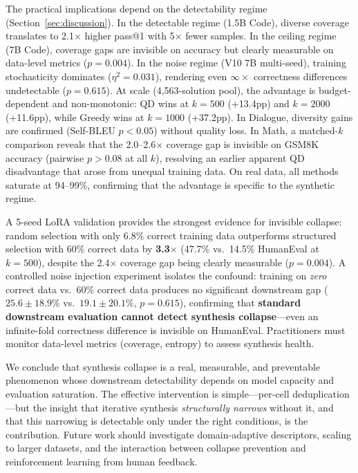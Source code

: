 \documentclass{article}
\begin{document}
\begin{enumerate}[nosep]
The practical implications depend on the detectability regime (Section~\ref{sec:discussion}).
In the detectable regime (1.5B Code), diverse coverage translates to 2.1$\times$ higher pass@1 with 5$\times$ fewer samples.
In the ceiling regime (7B Code), coverage gaps are invisible on accuracy but clearly measurable on data-level metrics ($p{=}0.004$).
In the noise regime (V10 7B multi-seed), training stochasticity dominates ($\eta^2{=}0.031$), rendering even $\infty\times$ correctness differences undetectable ($p{=}0.615$).
At scale (4,563-solution pool), the advantage is budget-dependent and non-monotonic: QD wins at $k{=}500$ (+13.4pp) and $k{=}2000$ (+11.6pp), while Greedy wins at $k{=}1000$ (+37.2pp).
In Dialogue, diversity gains are confirmed (Self-BLEU $p{<}0.05$) without quality loss.
In Math, a matched-$k$ comparison reveals that the 2.0--2.6$\times$ coverage gap is invisible on GSM8K accuracy (pairwise $p{>}0.08$ at all $k$), resolving an earlier apparent QD disadvantage that arose from unequal training data.
On real data, all methods saturate at 94--99\%, confirming that the advantage is specific to the synthetic regime.

A 5-seed LoRA validation provides the strongest evidence for invisible collapse: random selection with only 6.8\% correct training data outperforms structured selection with 60\% correct data by \textbf{3.3$\times$} (47.7\% vs.\ 14.5\% HumanEval at $k{=}500$), despite the 2.4$\times$ coverage gap being clearly measurable ($p{=}0.004$).
A controlled noise injection experiment isolates the confound: training on \emph{zero} correct data vs.\ 60\% correct data produces no significant downstream gap ($25.6{\pm}18.9\%$ vs.\ $19.1{\pm}20.1\%$, $p{=}0.615$), confirming that \textbf{standard downstream evaluation cannot detect synthesis collapse}---even an infinite-fold correctness difference is invisible on HumanEval.
Practitioners must monitor data-level metrics (coverage, entropy) to assess synthesis health.

We conclude that synthesis collapse is a real, measurable, and preventable phenomenon whose downstream detectability depends on model capacity and evaluation saturation.
The effective intervention is simple---per-cell deduplication---but the insight that iterative synthesis \emph{structurally narrows} without it, and that this narrowing is detectable only under the right conditions, is the contribution.
Future work should investigate domain-adaptive descriptors, scaling to larger datasets, and the interaction between collapse prevention and reinforcement learning from human feedback.


\end{enumerate}
\end{document}
